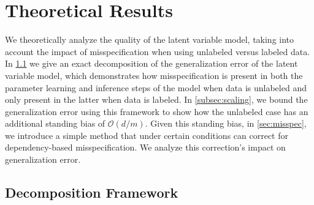 \section{Theoretical Results} \label{sec:theory}
\vspace{-.5em}
We theoretically analyze the quality of the latent variable model, taking into account the impact of misspecification when using unlabeled versus labeled data. %
In \ref{subsec:decomp} we give 
an exact decomposition of the generalization error of the latent variable model, which demonstrates how misspecification is present in both the parameter learning and inference steps of the model when data is unlabeled and only present in the latter when data is labeled. In \ref{subsec:scaling}, we bound the generalization error using this framework to show how the unlabeled case has an additional standing bias of $\mathcal{O}(d/m)$. Given this standing bias, in \ref{sec:misspec}, we introduce a simple method that under certain conditions can correct for dependency-based misspecification. We analyze this correction's impact on generalization error. 




\subsection{Decomposition Framework}
\label{subsec:decomp}%
\vspace{-0.5em}


